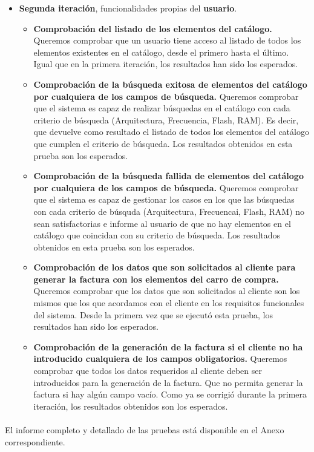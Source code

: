 \begin{itemize}
\item \vspace{0.1in} \textbf{Segunda iteración}, funcionalidades propias del \textbf{usuario}.
	\begin{itemize}
	\item \textbf{Comprobación del listado de los elementos del catálogo.} Queremos comprobar que un usuario tiene acceso al listado de todos los elementos existentes en el catálogo, desde el primero hasta el último. Igual que en la primera iteración, los resultados han sido los esperados.
	
	\item \textbf{Comprobación de la búsqueda exitosa de elementos del catálogo por cualquiera de los campos de búsqueda.} Queremos comprobar que el sistema es capaz de realizar búsquedas en el catálogo con cada criterio de búsqueda (Arquitectura, Frecuencia, Flash, RAM). Es decir, que devuelve como resultado el listado de todos los elementos del catálogo que cumplen el criterio de búsqueda. Los resultados obtenidos en esta prueba son los esperados.
	
	\item \textbf{Comprobación de la búsqueda fallida de elementos del catálogo por cualquiera de los campos de búsqueda.} Queremos comprobar que el sistema es capaz de gestionar los casos en los que las búsquedas con cada criterio de búsquda (Arquitectura, Frecuencai, Flash, RAM) no sean satisfactorias e informe al usuario de que no hay elementos en el catálogo que coincidan con su criterio de búsqueda. Los resultados obtenidos en esta prueba son los esperados.

	\item \textbf{Comprobación de los datos que son solicitados al cliente para generar la factura con los elementos del carro de compra.} Queremos comprobar que los datos que son solicitados al cliente son los mismos que los que acordamos con el cliente en los requisitos funcionales del sistema. Desde la primera vez que se ejecutó esta prueba, los resultados han sido los esperados.
	
	\item \textbf{Comprobación de la generación de la factura si el cliente no ha introducido cualquiera de los campos obligatorios.} Queremos comprobar que todos los datos requeridos al cliente deben ser introducidos para la generación de la factura. Que no permita generar la factura si hay algún campo vacío. Como ya se corrigió durante la primera iteración, los resultados obtenidos son los esperados.
	\end{itemize}			
\end{itemize}
\paragraph{}El informe completo y detallado de las pruebas está disponible en el Anexo correspondiente.